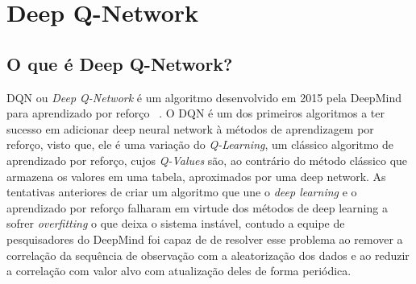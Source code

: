 

\chapter{Deep Q-Network}
\label{cap:dqn}

\section{O que é Deep Q-Network?}
\label{sec:o-que-e-dqn}

\enlargethispage{.5\baselineskip}
DQN ou \textit{Deep Q-Network} é um algoritmo desenvolvido em 2015 pela DeepMind para aprendizado por reforço ~\citep{Human-level-control}. O DQN é um dos primeiros algoritmos a ter sucesso em adicionar deep neural network à métodos de aprendizagem por reforço, visto que, ele é uma variação do \textit{Q-Learning}, um clássico algoritmo de aprendizado por reforço, cujos \textit{Q-Values} são, ao contrário do método clássico que armazena os valores em uma tabela, aproximados por uma deep network. As tentativas anteriores de criar um algoritmo que une o \textit{deep learning} e o aprendizado por reforço falharam em virtude dos métodos de deep learning a sofrer \textit{overfitting} o que deixa o sistema instável, contudo a equipe de pesquisadores do DeepMind foi capaz de de resolver esse problema ao remover a correlação da sequência de observação com a aleatorização dos dados e ao reduzir a correlação com valor alvo com atualização deles de forma periódica.  